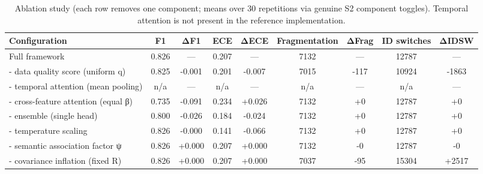 \begin{table}[t]
\centering
\caption{Ablation study (each row removes one component; means over 30 repetitions via genuine S2 component toggles). Temporal attention is not present in the reference implementation.}
\label{tab:ablation}
\begin{tabular}{lcccccccc}
\hline
Configuration & F1 & ΔF1 & ECE & ΔECE & Fragmentation & ΔFrag & ID switches & ΔIDSW \\
\hline
Full framework & 0.826 & — & 0.207 & — & 7132 & — & 12787 & — \\
- data quality score (uniform q) & 0.825 & -0.001 & 0.201 & -0.007 & 7015 & -117 & 10924 & -1863 \\
- temporal attention (mean pooling) & n/a & — & n/a & — & n/a & — & n/a & — \\
- cross-feature attention (equal β) & 0.735 & -0.091 & 0.234 & +0.026 & 7132 & +0 & 12787 & +0 \\
- ensemble (single head) & 0.800 & -0.026 & 0.184 & -0.024 & 7132 & +0 & 12787 & +0 \\
- temperature scaling & 0.826 & -0.000 & 0.141 & -0.066 & 7132 & +0 & 12787 & +0 \\
- semantic association factor ψ & 0.826 & +0.000 & 0.207 & +0.000 & 7132 & -0 & 12787 & -0 \\
- covariance inflation (fixed R) & 0.826 & +0.000 & 0.207 & +0.000 & 7037 & -95 & 15304 & +2517 \\
\hline
\end{tabular}
\end{table}
